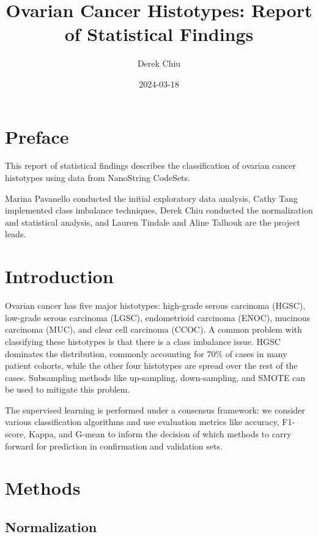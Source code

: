 \documentclass[
]{report}
\title{Ovarian Cancer Histotypes: Report of Statistical Findings}
\author{Derek Chiu}
\date{2024-03-18}
\begin{document}
\maketitle

{
\hypersetup{linkcolor=}
\setcounter{tocdepth}{1}
\tableofcontents
}
\listoffigures
\listoftables
\hypertarget{preface}{%
\chapter*{Preface}\label{preface}}

This report of statistical findings describes the classification of ovarian cancer histotypes using data from NanoString CodeSets.

Marina Pavanello conducted the initial exploratory data analysis, Cathy Tang implemented class imbalance techniques, Derek Chiu conducted the normalization and statistical analysis, and Lauren Tindale and Aline Talhouk are the project leads.

\hypertarget{introduction}{%
\chapter{Introduction}\label{introduction}}

Ovarian cancer has five major histotypes: high-grade serous carcinoma (HGSC), low-grade serous carcinoma (LGSC), endometrioid carcinoma (ENOC), mucinous carcinoma (MUC), and clear cell carcinoma (CCOC). A common problem with classifying these histotypes is that there is a class imbalance issue. HGSC dominates the distribution, commonly accounting for 70\% of cases in many patient cohorts, while the other four histotypes are spread over the rest of the cases. Subsampling methods like up-sampling, down-sampling, and SMOTE can be used to mitigate this problem.

The supervised learning is performed under a consensus framework: we consider various classification algorithms and use evaluation metrics like accuracy, F1-score, Kappa, and G-mean to inform the decision of which methods to carry forward for prediction in confirmation and validation sets.

\hypertarget{methods}{%
\chapter{Methods}\label{methods}}

\hypertarget{normalization}{%
\section{Normalization}\label{normalization}}
\end{document}
